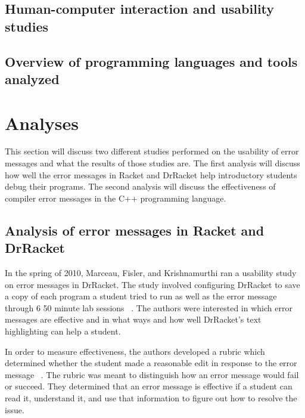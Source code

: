 \documentclass{sig-alternate}
\begin{document}

\subsection{Human-computer interaction and usability studies}


\subsection{Overview of programming languages and tools analyzed}



\section{Analyses}\label{analyses}
This section will discuss two different studies performed on the usability of error messages and what the results of those studies are. The first analysis will discuss how well the error messages in Racket and DrRacket help introductory students debug their programs. The second analysis will discuss the effectiveness of compiler error messages in the C++ programming language. 


\subsection{Analysis of error messages in Racket and DrRacket}
In the spring of 2010, Marceau, Fisler, and Krishnamurthi ran a usability study on error messages in DrRacket. The study involved configuring DrRacket to save a copy of each program a student tried to run as well as the error message through 6 50 minute lab sessions ~\cite{Marceau:2011:MEE:1953163.1953308}. The authors were interested in which error messages are effective and in what ways and how well DrRacket's text highlighting can help a student.  


In order to measure effectiveness, the authors developed a rubric which determined whether the student made a reasonable edit in response to the error message ~\cite{Marceau:2011:MEE:1953163.1953308}. The rubric was meant to distinguish how an error message would fail or succeed. They determined that an error message is effective if a student can read it, understand it, and use that information to figure out how to resolve the issue. 
\end{document}
